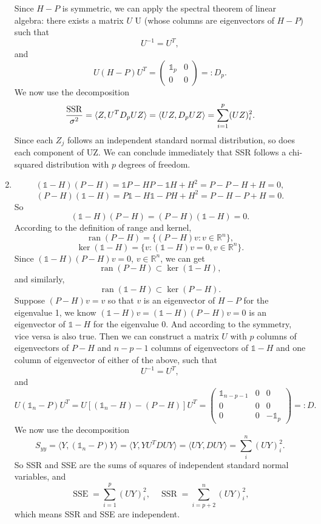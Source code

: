 \documentclass[11pt,a4paper]{article}
\begin{document}
\begin{enumerate}[label=\roman*)]
Since $H-P$ is symmetric, we can apply the spectral theorem of linear algebra: there exists a matrix $U$ U (whose columns are eigenvectors of $H-P$) such that
$$U^{-1}=U^T,$$
and
$$U(H-P)U^T=\begin{pmatrix}
\mathbb{1}_p & 0 \\ 0 & 0
\end{pmatrix}=:D_p.$$
We now use the decomposition
$$\frac{\rm SSR}{\sigma^2}=\langle Z,U^TD_pUZ\rangle=\langle UZ,D_pUZ\rangle=\sum_{i=1}^p(UZ)_i^2.$$
Since each $Z_j$ follows an independent standard normal distribution, so does each component of UZ. We can
conclude immediately that SSR follows a chi-squared distribution with $p$ degrees of freedom.
\item
$$(\mathbb{1}-H)(P-H)=\mathbb{1}P-HP-\mathbb{1}H+H^2=P-P-H+H=0,$$
$$(P-H)(\mathbb{1}-H)=P\mathbb{1}-H\mathbb{1}-PH+H^2=P-H-P+H=0.$$
So $$(\mathbb{1}-H)(P-H)=(P-H)(\mathbb{1}-H)=0.$$
According to the definition of range and kernel,
$$\operatorname{ran}(P-H)=\{(P-H)v:v\in\mathbb{R}^n\},$$
$$\ker(\mathbb{1}-H)=\{v:(\mathbb{1}-H)v=0,v\in\mathbb{R}^n\}.$$
Since $(\mathbb{1}-H)(P-H)v=0$, $v\in\mathbb{R}^n$, we can get $$\operatorname{ran}(P-H)\subset\ker(\mathbb{1}-H),$$
and similarly, $$\operatorname{ran}(\mathbb{1}-H)\subset\ker(P-H).$$
Suppose $(P-H)v=v$ so that $v$ is an eigenvector of $H-P$ for the eigenvalue 1, we know $(\mathbb{1}-H)v=(\mathbb{1}-H)(P-H)v=0$ is an eigenvector of $\mathbb{1}-H$ for the eigenvalue  0. And according to the symmetry, vice versa is also true. Then we can construct a matrix $U$ with $p$ columns of eigenvectors of $P-H$ and $n-p-1$ columns of eigenvectors of $\mathbb{1}-H$ and one column of eigenvector of either of the above,  such that
$$U^{-1}=U^T,$$
and
$$U(\mathbb{1}_n-P)U^T=U[(\mathbb{1}_n-H)-(P-H)]U^T=\begin{pmatrix}
\mathbb{1}_{n-p-1} & 0 & 0 \\ 0 & 0 & 0 \\ 0 & 0 & -\mathbb{1}_p
\end{pmatrix}=:D.$$
We now use the decomposition
$$S_{yy}=\langle Y,(\mathbb{1}_n-P)Y\rangle=\langle Y,YU^TDUY\rangle=\langle UY,DUY\rangle=\sum_i^{n}(UY)_i^2.$$
So SSR and SSE are the sums of squares of independent standard normal variables, and
$$\operatorname{SSE}=\sum_{i=1}^{p}(UY)_i^2,\quad\operatorname{SSR}=\sum_{i=p+2}^{n}(UY)_i^2,$$
which means SSR and SSE are independent.
\end{enumerate}
\end{document}
